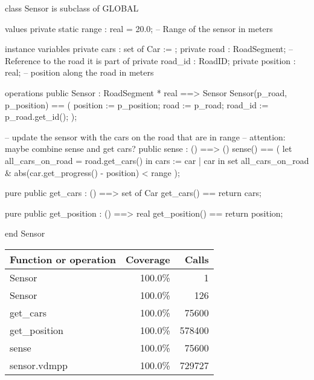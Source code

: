 \documentclass[a4paper]{article}
\begin{document}
\title{}
\author{}
\begin{vdm_al}
class Sensor is subclass of GLOBAL

values
    private static range : real = 20.0; -- Range of the sensor in meters

instance variables
    private cars : set of Car := {};
    private road : RoadSegment; -- Reference to the road it is part of
    private road_id : RoadID;
    private position : real; -- position along the road in meters

operations
    public Sensor : RoadSegment * real ==> Sensor
    Sensor(p_road, p_position) == (
        position := p_position;
        road := p_road;
        road_id := p_road.get_id();
    );

    -- update the sensor with the cars on the road that are in range
    -- attention: maybe combine sense and get cars?
    public sense : () ==> ()
    sense() == (
        let all_cars_on_road = road.get_cars() in
            cars := { car | car in set all_cars_on_road & abs(car.get_progress() - position) < range }
    );

    pure public get_cars : () ==> set of Car
    get_cars() == return cars;

    pure public get_position : () ==> real
    get_position() == return position;

end Sensor
\end{vdm_al}
\bigskip
\begin{longtable}{|l|r|r|}
\hline
Function or operation & Coverage & Calls \\
\hline
\hline
Sensor & 100.0\% & 1 \\
\hline
Sensor & 100.0\% & 126 \\
\hline
get\_cars & 100.0\% & 75600 \\
\hline
get\_position & 100.0\% & 578400 \\
\hline
sense & 100.0\% & 75600 \\
\hline
\hline
sensor.vdmpp & 100.0\% & 729727 \\
\hline
\end{longtable}
\end{document}
